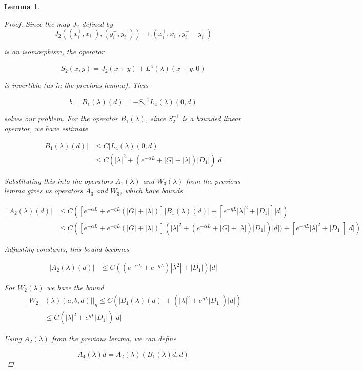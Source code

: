 \documentclass[12pt]{article}
\newtheorem{lemma}{Lemma}
\begin{document}
\begin{lemma}
\begin{proof}
Since the map $J_2$ defined by
\[
J_2( (x_i^+, x_i^-),(y_i^+, y_i^-)) \rightarrow ( x_i^+, x_i^-, y_i^+ -  y_i^- )
\]

is an isomorphism, the operator

\[
S_2(x,y) = J_2(x+y) + L^4(\lambda)(x+y,0)
\]

is invertible (as in the previous lemma). Thus

\[
b = B_1(\lambda)(d) = -S_2^{-1}L_4(\lambda)(0,d)
\]

solves our problem. For the operator $B_1(\lambda)$, since $S_2^{-1}$ is a bounded linear operator, we have estimate

\begin{align*}
|B_1(\lambda)(d)| &\leq C |L_4(\lambda)(0,d)| \\
&\leq C(|\lambda|^2 + (e^{-\alpha L} + |G| + |\lambda|)|D_1| )|d|
\end{align*}

Substituting this into the operators $A_1(\lambda)$ and $W_3(\lambda)$ from the previous lemma gives us operators $A_3$ and $W_3$, which have bounds

\begin{align*}
|A_2(\lambda)(d)| &\leq C\left( \left[e^{-\alpha L} + e^{-\eta L} \left(|G| + |\lambda|\right) \right]|B_1(\lambda)(d)| + \left[ e^{-\eta L} |\lambda|^2 + |D_1| \right] |d| \right)\\
&\leq C\left( \left[e^{-\alpha L} + e^{-\eta L} \left(|G| + |\lambda|\right) \right](|\lambda|^2 + (e^{-\alpha L} + |G| + |\lambda|)|D_1| )|d|)+ \left[ e^{-\eta L} |\lambda|^2 + |D_1| \right] |d| \right)
\end{align*}

Adjusting constants, this bound becomes

\begin{align*}
|A_2(\lambda)(d)| &\leq C\left( (e^{-\alpha L} + e^{-\eta L})|\lambda^2| + |D_1| \right)|d|
\end{align*}

For $W_2(\lambda)$ we have the bound
\begin{align*}
||W_2&(\lambda)(a,b,d)||_\eta \leq C \left( |B_1(\lambda)(d)| + \left( |\lambda|^2 + e^{\eta L}|D_1| \right) |d|\right) \\
&\leq C \left( |\lambda|^2 + e^{\eta L}|D_1|\right)|d|
\end{align*} 

Using $A_2(\lambda)$ from the previous lemma, we can define

\[
A_4(\lambda)d = A_2(\lambda)(B_1(\lambda)d,d)
\]


\end{proof}
\end{lemma}
\end{document}

